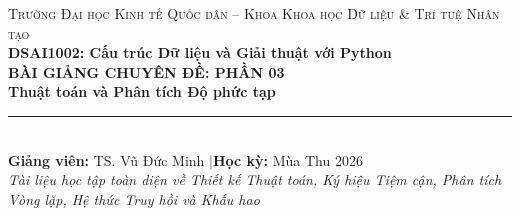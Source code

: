 \documentclass[11pt,a4paper]{article}
\begin{document}

\begin{tcolorbox}[
    enhanced,
    colback=SoftGreen,
    colframe=ForestGreen,
    boxrule=1.5pt,
    arc=3mm,
    left=5mm, right=5mm, top=6mm, bottom=6mm
]
\begin{center}
    {\Large\scshape Trường Đại học Kinh tế Quốc dân -- Khoa Khoa học Dữ liệu \& Trí tuệ Nhân tạo}\\[0.3em]
    {\large\textbf{\color{DarkBlue}DSAI1002: Cấu trúc Dữ liệu và Giải thuật với Python}}\\[0.8em]
    {\Huge\bfseries\color{ForestGreen} BÀI GIẢNG CHUYÊN ĐỀ: PHẦN 03}\\[0.4em]
    {\LARGE\bfseries\color{DarkGray} Thuật toán và Phân tích Độ phức tạp}\\[0.8em]
    \rule{0.7\textwidth}{0.8pt}\\[0.6em]
    {\normalsize\textbf{Giảng viên:} TS. Vũ Đức Minh \quad$|$\quad \textbf{Học kỳ:} Mùa Thu 2026}\\[0.2em]
    {\small\textit{Tài liệu học tập toàn diện về Thiết kế Thuật toán, Ký hiệu Tiệm cận, Phân tích Vòng lặp, Hệ thức Truy hồi và Khấu hao}}
\end{center}
\end{tcolorbox}

\vspace{0.5em}
\end{document}
